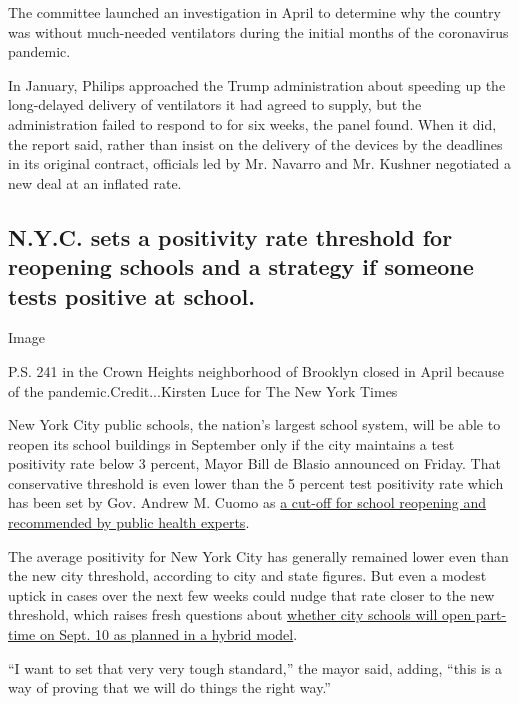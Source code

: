 The committee launched an investigation in April to determine why the
country was without much-needed ventilators during the initial months of
the coronavirus pandemic.

In January, Philips approached the Trump administration about speeding
up the long-delayed delivery of ventilators it had agreed to supply, but
the administration failed to respond to for six weeks, the panel found.
When it did, the report said, rather than insist on the delivery of the
devices by the deadlines in its original contract, officials led by Mr.
Navarro and Mr. Kushner negotiated a new deal at an inflated rate.

\hypertarget{nyc-sets-a-positivity-rate-threshold-for-reopening-schools-and-a-strategy-if-someone-tests-positive-at-school-1}{%
\subsection{N.Y.C. sets a positivity rate threshold for reopening
schools and a strategy if someone tests positive at
school.}\label{nyc-sets-a-positivity-rate-threshold-for-reopening-schools-and-a-strategy-if-someone-tests-positive-at-school-1}}

Image

P.S. 241 in the Crown Heights neighborhood of Brooklyn closed in April
because of the pandemic.Credit...Kirsten Luce for The New York Times

New York City public schools, the nation's largest school system, will
be able to reopen its school buildings in September only if the city
maintains a test positivity rate below 3 percent, Mayor Bill de Blasio
announced on Friday. That conservative threshold is even lower than the
5 percent test positivity rate which has been set by Gov. Andrew M.
Cuomo as
\href{https://www.nytimes.com/2020/07/14/us/coronavirus-schools-fall.html}{a
cut-off for school reopening and recommended by public health experts}.

The average positivity for New York City has generally remained lower
even than the new city threshold, according to city and state figures.
But even a modest uptick in cases over the next few weeks could nudge
that rate closer to the new threshold, which raises fresh questions
about
\href{https://www.nytimes.com/2020/07/08/nyregion/nyc-schools-reopening-plan.html}{whether
city schools will open part-time on Sept. 10 as planned in a hybrid
model}.

``I want to set that very very tough standard,'' the mayor said, adding,
``this is a way of proving that we will do things the right way.''

